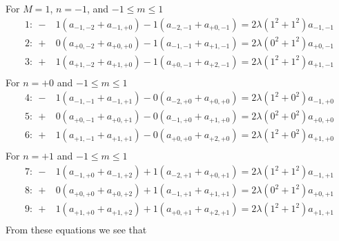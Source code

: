 \documentclass{article}
\newcommand{\0}{\mathbf{0}}
\newcommand{\1}{\mathbf{1}}
\newcommand{\2}{\mathbf{2}}
\newcommand{\3}{\mathbf{3}}
\newcommand{\4}{\mathbf{4}}
\newcommand{\5}{\mathbf{5}}
\newcommand{\6}{\mathbf{6}}
\newcommand{\7}{\mathbf{7}}
\newcommand{\8}{\mathbf{8}}
\begin{document}
For $M=1$, $n=-1$, and $-1\leq m\leq1$
%
\begin{align*} 
 1:\ -&1(a_{-1,-2}+a_{-1,+0})  -1(a_{-2,-1}+a_{+0,-1})=2\lambda(1^2+1^2)a_{-1,-1}\\
 2:\ +&0(a_{+0,-2}+a_{+0,+0}) -1(a_{-1,-1}+a_{+1,-1})=2\lambda(0^2+1^2)a_{+0,-1}\\
 3:\ +&1(a_{+1,-2}+a_{+1,+0}) -1(a_{+0,-1}+a_{+2,-1})=2\lambda(1^2+1^2)a_{+1,-1}\\
\end{align*}
%
For $n=+0$ and $-1\leq m\leq1$
%
\begin{align*} 
 4:\ -&1(a_{-1,-1}+a_{-1,+1})  -0(a_{-2,+0}+a_{+0,+0})=2\lambda(1^2+0^2)a_{-1,+0}\\
 5:\ +&0(a_{+0,-1}+a_{+0,+1}) -0(a_{-1,+0}+a_{+1,+0})=2\lambda(0^2+0^2)a_{+0,+0}\\
 6:\ +&1(a_{+1,-1}+a_{+1,+1}) -0(a_{+0,+0}+a_{+2,+0})=2\lambda(1^2+0^2)a_{+1,+0}\\ 
\end{align*}
%
For $n=+1$ and $-1\leq m\leq1$
%
\begin{align*}
 7:\  -&1(a_{-1,+0}+a_{-1,+2})  +1(a_{-2,+1}+a_{+0,+1})=2\lambda(1^2+1^2)a_{-1,+1}\\
 8:\  +&0(a_{+0,+0}+a_{+0,+2}) +1(a_{-1,+1}+a_{+1,+1})=2\lambda(0^2+1^2)a_{+0,+1}\\
 9:\  +&1(a_{+1,+0}+a_{+1,+2}) +1(a_{+0,+1}+a_{+2,+1})=2\lambda(1^2+1^2)a_{+1,+1}\\
\end{align*}
%
%
From these equations we see that
\end{document}
